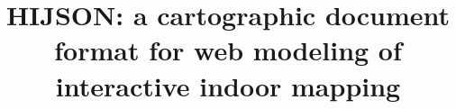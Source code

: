 \documentclass{sig-alternate}
\begin{document}
%

\title{HIJSON: a cartographic document format for web modeling of interactive indoor mapping}
%
%
%
%
%
\end{document}
